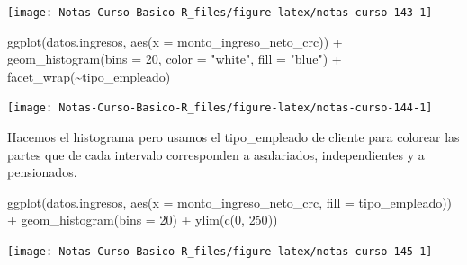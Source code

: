 \documentclass[
  12pt,
]{book}
\newenvironment{Shaded}{\begin{snugshade}}{\end{snugshade}}
\newcommand{\AttributeTok}[1]{\textcolor[rgb]{0.77,0.63,0.00}{#1}}
\newcommand{\DecValTok}[1]{\textcolor[rgb]{0.00,0.00,0.81}{#1}}
\newcommand{\FunctionTok}[1]{\textcolor[rgb]{0.00,0.00,0.00}{#1}}
\newcommand{\NormalTok}[1]{#1}
\newcommand{\SpecialCharTok}[1]{\textcolor[rgb]{0.00,0.00,0.00}{#1}}
\newcommand{\StringTok}[1]{\textcolor[rgb]{0.31,0.60,0.02}{#1}}
\begin{document}
\begin{center}\texttt{[image: Notas-Curso-Basico-R\_files/figure-latex/notas-curso-143-1]} \end{center}

\begin{Shaded}
\begin{Highlighting}[]
\FunctionTok{ggplot}\NormalTok{(datos.ingresos, }\FunctionTok{aes}\NormalTok{(}\AttributeTok{x =}\NormalTok{ monto\_ingreso\_neto\_crc)) }\SpecialCharTok{+}
  \FunctionTok{geom\_histogram}\NormalTok{(}\AttributeTok{bins =} \DecValTok{20}\NormalTok{, }\AttributeTok{color =} \StringTok{"white"}\NormalTok{, }\AttributeTok{fill =} \StringTok{"blue"}\NormalTok{) }\SpecialCharTok{+}
  \FunctionTok{facet\_wrap}\NormalTok{(}\SpecialCharTok{\textasciitilde{}}\NormalTok{tipo\_empleado)}
\end{Highlighting}
\end{Shaded}

\begin{center}\texttt{[image: Notas-Curso-Basico-R\_files/figure-latex/notas-curso-144-1]} \end{center}

Hacemos el histograma pero usamos el tipo\_empleado de cliente para colorear las partes que de cada intervalo corresponden a asalariados, independientes y a pensionados.

\begin{Shaded}
\begin{Highlighting}[]
\FunctionTok{ggplot}\NormalTok{(datos.ingresos, }\FunctionTok{aes}\NormalTok{(}\AttributeTok{x =}\NormalTok{ monto\_ingreso\_neto\_crc, }\AttributeTok{fill =}\NormalTok{ tipo\_empleado)) }\SpecialCharTok{+}
  \FunctionTok{geom\_histogram}\NormalTok{(}\AttributeTok{bins =} \DecValTok{20}\NormalTok{) }\SpecialCharTok{+}
  \FunctionTok{ylim}\NormalTok{(}\FunctionTok{c}\NormalTok{(}\DecValTok{0}\NormalTok{, }\DecValTok{250}\NormalTok{))}
\end{Highlighting}
\end{Shaded}

\begin{center}\texttt{[image: Notas-Curso-Basico-R\_files/figure-latex/notas-curso-145-1]} \end{center}
\end{document}
